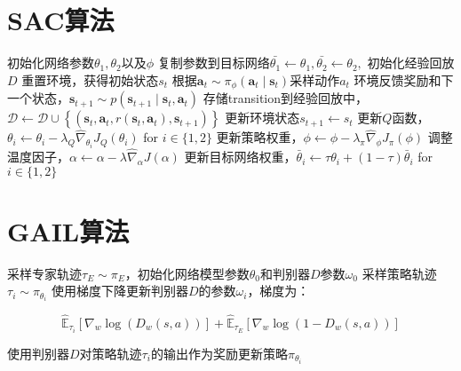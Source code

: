 \documentclass[11pt]{ctexart}
\begin{document}
\section{SAC算法}
\begin{algorithm}[H] %
    \renewcommand{\thealgorithm}{} %
	\caption{} 
	\begin{algorithmic}[1]
		\STATE 初始化网络参数$\theta_1,\theta_2$以及$\phi$ %
		\STATE 复制参数到目标网络$\bar{\theta_1} \leftarrow \theta_1,\bar{\theta_2} \leftarrow \theta_2,$
		\STATE 初始化经验回放$D$
			\STATE 重置环境，获得初始状态$s_t$
				\STATE 根据$\boldsymbol{a}_{t} \sim \pi_{\phi}\left(\boldsymbol{a}_{t} \mid \mathbf{s}_{t}\right)$采样动作$a_t$
				\STATE 环境反馈奖励和下一个状态，$\mathbf{s}_{t+1} \sim p\left(\mathbf{s}_{t+1} \mid \mathbf{s}_{t}, \mathbf{a}_{t}\right)$
				\STATE 存储transition到经验回放中，$\mathcal{D} \leftarrow \mathcal{D} \cup\left\{\left(\mathbf{s}_{t}, \mathbf{a}_{t}, r\left(\mathbf{s}_{t}, \mathbf{a}_{t}\right), \mathbf{s}_{t+1}\right)\right\}$
				\STATE 更新环境状态$s_{t+1} \leftarrow s_t$
				\STATE 更新$Q$函数，$\theta_{i} \leftarrow \theta_{i}-\lambda_{Q} \hat{\nabla}_{\theta_{i}} J_{Q}\left(\theta_{i}\right)$ for $i \in\{1,2\}$
				\STATE 更新策略权重，$\phi \leftarrow \phi-\lambda_{\pi} \hat{\nabla}_{\phi} J_{\pi}(\phi)$ 
				\STATE 调整温度因子，$\alpha \leftarrow \alpha-\lambda \hat{\nabla}_{\alpha} J(\alpha)$ 
				\STATE 更新目标网络权重，$\bar{\theta}_{i} \leftarrow \tau \theta_{i}+(1-\tau) \bar{\theta}_{i}$ for $i \in\{1,2\}$
			\ENDFOR
		\ENDFOR
	\end{algorithmic}	
\end{algorithm}
\clearpage


\section{GAIL算法}
\begin{algorithm}[H] %
	\renewcommand{\thealgorithm}{} %
	\caption{} 
	\begin{algorithmic}[1] %
		\STATE 采样专家轨迹$\tau _{E} \sim \pi _{E}$，初始化网络模型参数$\theta _{0}$和判别器$D$参数$\omega _{0}$
			\STATE 采样策略轨迹$\tau_{i} \sim \pi _{\theta _{i}}$
			\STATE 使用梯度下降更新判别器$D$的参数$\omega _{i}$，梯度为：
			\begin{center}
				\begin{equation}
				\hat{\mathbb{E}}_{\tau_{i}}\left[\nabla_{w} \log \left(D_{w}(s, a)\right)\right]+\hat{\mathbb{E}}_{\tau_{E}}\left[\nabla_{w} \log \left(1-D_{w}(s, a)\right)\right]
				\end{equation}
			\end{center}
			\STATE 使用判别器$D$对策略轨迹$\tau_{i}$的输出作为奖励更新策略$\pi _{\theta _{i}}$\footnotemark[2]
		\ENDFOR
	\end{algorithmic}
\end{algorithm}
\clearpage
\end{document}
